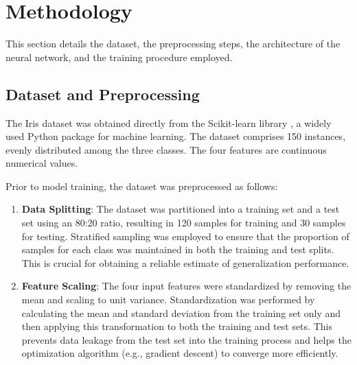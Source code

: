 \documentclass[12pt,a4paper]{article}
\begin{document}
	\section{Methodology}
	This section details the dataset, the preprocessing steps, the architecture of the neural network, and the training procedure employed.
	
	\subsection{Dataset and Preprocessing}
	The Iris dataset was obtained directly from the Scikit-learn library \cite{scikit-learn}, a widely used Python package for machine learning. The dataset comprises 150 instances, evenly distributed among the three classes. The four features are continuous numerical values.
	
	Prior to model training, the dataset was preprocessed as follows:
	\begin{enumerate}
		\item \textbf{Data Splitting}: The dataset was partitioned into a training set and a test set using an 80:20 ratio, resulting in 120 samples for training and 30 samples for testing. Stratified sampling was employed to ensure that the proportion of samples for each class was maintained in both the training and test splits. This is crucial for obtaining a reliable estimate of generalization performance.
		\item \textbf{Feature Scaling}: The four input features were standardized by removing the mean and scaling to unit variance. Standardization was performed by calculating the mean and standard deviation from the training set only and then applying this transformation to both the training and test sets. This prevents data leakage from the test set into the training process and helps the optimization algorithm (e.g., gradient descent) to converge more efficiently.
	\end{enumerate}
	
\end{document}
